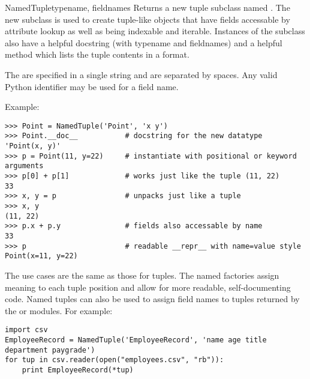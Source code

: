 \begin{funcdesc}{NamedTuple}{typename, fieldnames}
  Returns a new tuple subclass named .  The new subclass is used
  to create tuple-like objects that have fields accessable by attribute
  lookup as well as being indexable and iterable.  Instances of the subclass
  also have a helpful docstring (with typename and fieldnames) and a helpful
   method which lists the tuple contents in a 
  format.

  The  are specified in a single string and are separated by spaces.
  Any valid Python identifier may be used for a field name.

  Example:
  \begin{verbatim}
>>> Point = NamedTuple('Point', 'x y')
>>> Point.__doc__           # docstring for the new datatype
'Point(x, y)'
>>> p = Point(11, y=22)     # instantiate with positional or keyword arguments
>>> p[0] + p[1]             # works just like the tuple (11, 22)
33
>>> x, y = p                # unpacks just like a tuple
>>> x, y
(11, 22)
>>> p.x + p.y               # fields also accessable by name
33
>>> p                       # readable __repr__ with name=value style
Point(x=11, y=22)  
\end{verbatim}

  The use cases are the same as those for tuples.  The named factories
  assign meaning to each tuple position and allow for more readable,
  self-documenting code.  Named tuples can also be used to assign field names 
  to tuples
  returned by the  or  modules.  For example:

  \begin{verbatim}
import csv
EmployeeRecord = NamedTuple('EmployeeRecord', 'name age title department paygrade')
for tup in csv.reader(open("employees.csv", "rb")):
    print EmployeeRecord(*tup)
\end{verbatim}

\end{funcdesc}
